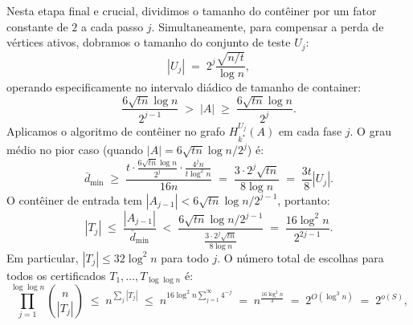 \documentclass[reqno,a4paper,12pt]{amsart}
\begin{document}
Nesta etapa final e crucial, dividimos o tamanho do contêiner por um fator constante de $2$ a cada passo $j$. Simultaneamente, para compensar a perda de vértices ativos, dobramos o tamanho do conjunto de teste $U_j$:
\[
  |U_j| \;=\; 2^j \frac{\sqrt{n/t}}{\log n},
\]
operando especificamente no intervalo diádico de tamanho de container:
\[
  \frac{6\sqrt{t n}\log n}{2^{j-1}} \;>\; |A| \;\geq\; \frac{6\sqrt{t n}\log n}{2^j}.
\]
Aplicamos o algoritmo de contêiner no grafo $H_{k^*}^{U_j}(A)$ em cada fase $j$. O grau médio no pior caso (quando $|A| = 6\sqrt{tn}\log n/2^j$) é:
\[
  \bar{d}_{\min} \;\geq\; \frac{t \cdot \frac{6\sqrt{tn}\log n}{2^j} \cdot \frac{4^j n}{t\log^2 n}}{16n} \;=\; \frac{3 \cdot 2^j\sqrt{tn}}{8\log n} \;=\; \frac{3t}{8}|U_j|.
\]
O contêiner de entrada tem $|A_{j-1}| < 6\sqrt{tn}\log n / 2^{j-1}$, portanto:
\[
  |T_j| \;\leq\; \frac{|A_{j-1}|}{\bar{d}_{\min}} \;<\; \frac{6\sqrt{tn}\log n / 2^{j-1}}{\frac{3 \cdot 2^j\sqrt{tn}}{8\log n}} \;=\; \frac{16\log^2 n}{2^{2j-1}}.
\]
Em particular, $|T_j| \leq 32\log^2 n$ para todo $j$. O número total de escolhas para todos os certificados $T_1, \ldots, T_{\log\log n}$ é:
\[
  \prod_{j=1}^{\log\log n} \binom{n}{|T_j|} \;\leq\; n^{\sum_j |T_j|} \;\leq\; n^{16\log^2 n \sum_{j=1}^{\infty} 4^{-j}} \;=\; n^{\frac{16\log^2 n}{3}} \;=\; 2^{O(\log^3 n)} \;=\; 2^{o(S)},
\]
\end{document}
